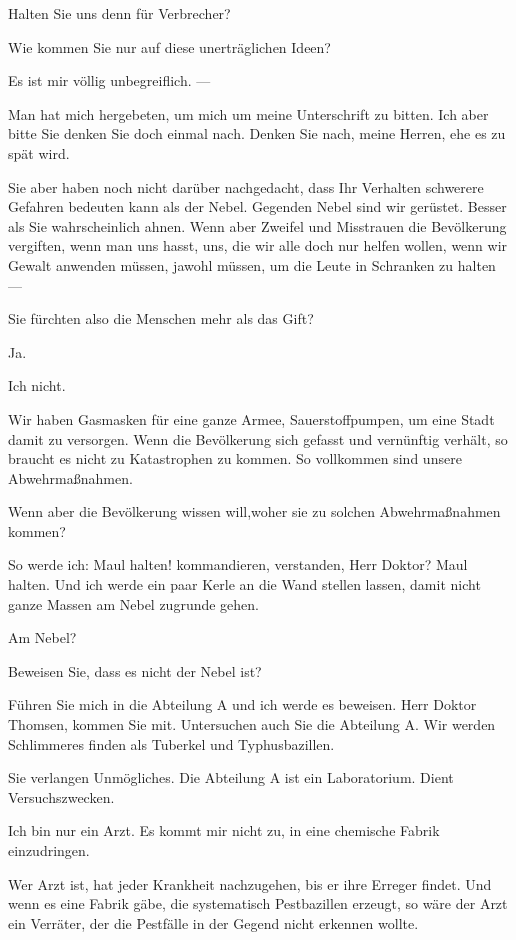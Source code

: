 \documentclass[
	final,
	a4paper,
	ngerman,
	mpinclude = true, %
	twoside = true,
	open = right,
	cleardoublepage = plain,
	DIV = 13,
	BCOR = 1cm,
	titlepage = firstiscover,
	]{scrbook}
\newcommand{\thecharacter}[1]{\textup{\textsc{#1}}\xspace}
\newcommand{\theAlexis}{\thecharacter{Alexis}}
\newcommand{\theThomsen}{\thecharacter{Thomsen}}
\newcommand{\theJonas}{\thecharacter{Jonas}}
\newcommand{\character}[1]{\item[#1]}
\newcommand{\Generaldirektor}{\character{Direktor}}
\newcommand{\Alexis}{\character{\theAlexis}}
\newcommand{\Thomsen}{\character{\theThomsen}}
\newcommand{\Jonas}{\character{\theJonas}}
\begin{document}
\begin{play}
\Alexis
Halten Sie uns denn für Verbrecher?

\Generaldirektor
Wie kommen Sie nur auf diese unerträglichen Ideen?

\Thomsen
Es ist mir völlig unbegreiflich. ---

\Jonas
Man hat mich hergebeten, um mich um meine Unterschrift zu bitten. Ich aber bitte Sie denken Sie doch einmal nach. Denken Sie nach, meine Herren, ehe es zu spät wird.

\Alexis
Sie aber haben noch nicht darüber nachgedacht, dass Ihr Verhalten schwerere Gefahren bedeuten kann als der Nebel. Gegenden Nebel sind wir gerüstet. Besser als Sie wahrscheinlich ahnen. Wenn aber Zweifel und Misstrauen die Bevölkerung vergiften, wenn man uns hasst, uns, die wir alle doch nur helfen wollen, wenn wir Gewalt anwenden müssen, jawohl müssen, um die Leute in Schranken zu halten ---

\Jonas
Sie fürchten also die Menschen mehr als das Gift?

\Alexis
Ja.

\Jonas
Ich nicht.

\Alexis
Wir haben Gasmasken für eine ganze Armee, Sauerstoffpumpen, um eine Stadt damit zu versorgen. Wenn die Bevölkerung sich gefasst und vernünftig verhält, so braucht es nicht zu Katastrophen zu kommen. So vollkommen sind unsere Abwehrmaßnahmen.

\Jonas
Wenn aber die Bevölkerung wissen will,woher sie zu solchen Abwehrmaßnahmen kommen?

\Alexis
So werde ich: Maul halten! kommandieren, verstanden, Herr Doktor? Maul halten. Und ich werde ein paar Kerle an die Wand stellen lassen, damit nicht ganze Massen am Nebel zugrunde gehen.

\Jonas
Am Nebel?

\Alexis
Beweisen Sie, dass es nicht der Nebel ist?

\Jonas
Führen Sie mich in die Abteilung A und ich werde es beweisen. Herr Doktor Thomsen, kommen Sie mit. Untersuchen auch Sie die Abteilung A. Wir werden Schlimmeres finden als Tuberkel und Typhusbazillen.

\Generaldirektor
Sie verlangen Unmögliches. Die Abteilung A ist ein Laboratorium. Dient Versuchszwecken.

\Thomsen
Ich bin nur ein Arzt. Es kommt mir nicht zu, in eine chemische Fabrik einzudringen.

\Jonas
Wer Arzt ist, hat jeder Krankheit nachzugehen, bis er ihre Erreger findet. Und wenn es eine Fabrik gäbe, die systematisch Pestbazillen erzeugt, so wäre der Arzt ein Verräter, der die Pestfälle in der Gegend nicht erkennen wollte.


\end{play}
\end{document}
